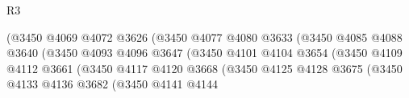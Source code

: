 \begin{lexlean}{R3}
\begin{coremodule}
                                                    (@3450
                                                      @4069
                                                      @4072
                                                      @3626
                                                      (@3450
                                                        @4077
                                                        @4080
                                                        @3633
                                                        (@3450
                                                          @4085
                                                          @4088
                                                          @3640
                                                          (@3450
                                                            @4093
                                                            @4096
                                                            @3647
                                                            (@3450
                                                              @4101
                                                              @4104
                                                              @3654
                                                              (@3450
                                                                @4109
                                                                @4112
                                                                @3661
                                                                (@3450
                                                                  @4117
                                                                  @4120
                                                                  @3668
                                                                  (@3450
                                                                    @4125
                                                                    @4128
                                                                    @3675
                                                                    (@3450
                                                                      @4133
                                                                      @4136
                                                                      @3682
                                                                      (@3450
                                                                        @4141
                                                                        @4144

\end{coremodule}
\end{lexlean}
